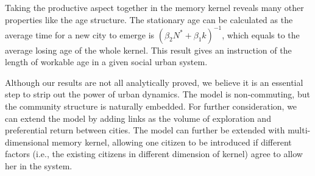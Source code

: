 \documentclass[reprint,unsortedaddress,amsmath,amssymb,aps,prl,showkeys]{revtex4-2}
\begin{document}
Taking the productive aspect together in the memory kernel reveals many other properties like the age structure. The stationary age can be calculated as the average time for a new city to emerge is $(\beta_2 N^* + \beta_1 k)^{-1}$, which equals to the average losing age of the whole kernel. This result gives an instruction of the length of workable age in a given social urban system.

Although our results are not all analytically proved, we believe it is an essential step to strip out the power of urban dynamics. The model is non-commuting, but the community structure is naturally embedded. For further consideration, we can extend the model by adding links as the volume of exploration and preferential return between cities\cite{WANG2019121921}. The model can further be extended with multi-dimensional memory kernel, allowing one citizen to be introduced if different factors\cite{doi:10.1098/rsif.2019.0564} (i.e., the existing citizens in different dimension of kernel) agree to allow her in the system.




\end{document}
